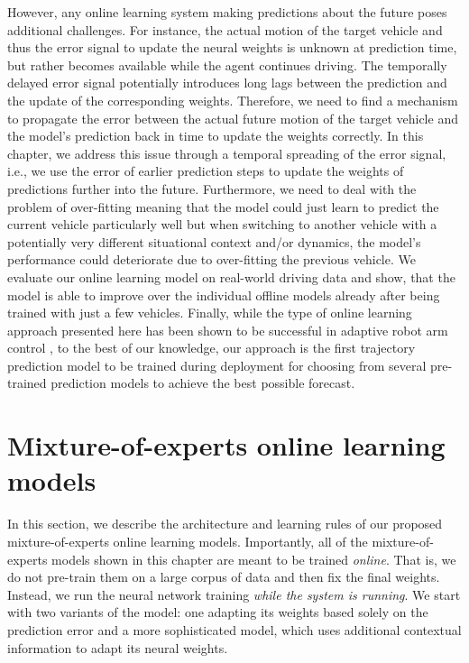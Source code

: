 However, any online learning system making predictions about the future poses additional challenges.
For instance, the actual motion of the target vehicle and thus the error signal to update the neural weights is unknown at prediction time, but rather becomes available while the agent continues driving.
The temporally delayed error signal potentially introduces long lags between the prediction and the update of the corresponding weights.
Therefore, we need to find a mechanism to propagate the error between the actual future motion of the target vehicle and the model's prediction back in time to update the weights correctly.
In this chapter, we address this issue through a temporal spreading of the error signal, i.e., we use the error of earlier prediction steps to update the weights of predictions further into the future.
Furthermore, we need to deal with the problem of over-fitting meaning that the model could just learn to predict the current vehicle particularly well but when switching to another vehicle with a potentially very different situational context and/or dynamics, the model's performance could deteriorate due to over-fitting the previous vehicle.
We evaluate our online learning model on real-world driving data and show, that the model is able to improve over the individual offline models already after being trained with just a few vehicles.
Finally, while the type of online learning approach presented here has been shown to be successful in adaptive robot arm control \parencite{DeWolf2016}, to the best of our knowledge, our approach is the first trajectory prediction model to be trained during deployment for choosing from several pre-trained prediction models to achieve the best possible forecast.  


\section{Mixture-of-experts online learning models}%
\label{sec:instantiating_mixture_of_experts_online_learning_models}

In this section, we describe the architecture and learning rules of our proposed mixture-of-experts online learning models.
Importantly, all of the mixture-of-experts models shown in this chapter are meant to be trained \emph{online}.
That is, we do not pre-train them on a large corpus of data and then fix the final weights.
Instead, we run the neural network training \emph{while the system is running}.
We start with two variants of the model: one adapting its weights based solely on the prediction error and a more sophisticated model, which uses additional contextual information to adapt its neural weights.

